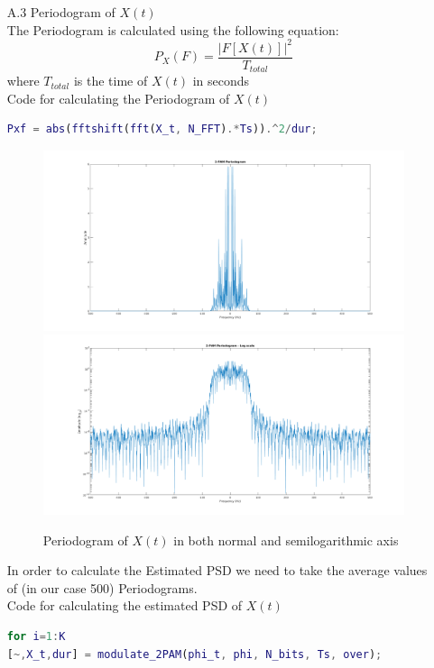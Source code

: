 \documentclass[12pt, a4paper]{article}
\begin{document}
\begin{enumerate}
\begin{enumerate}
        \item[A.3] Periodogram of \(X(t)\)\\
        The Periodogram is calculated using the following equation:
        \[P_X(F) = \frac{|F[X(t)]|^2}{T_{total}}\]
        where \(T_{total}\) is the time of \(X(t)\) in seconds\\
        Code for calculating the Periodogram of \(X(t)\)
        \begin{lstlisting}[language=MATLAB]
Pxf = abs(fftshift(fft(X_t, N_FFT).*Ts)).^2/dur;
       	\end{lstlisting}
        \begin{figure}[H]
            \centering
            \noindent\includegraphics[width=\textwidth]{2PAM_PSD_PLOT.png}
            \noindent\includegraphics[width=\textwidth]{2PAM_PSD.png}
            \caption{Periodogram of \(X(t)\) in both normal and semilogarithmic axis}
        \end{figure}
        In order to calculate the Estimated PSD we need to take the average values of (in our case 500) Periodograms.\\
        Code for calculating the estimated PSD of \(X(t)\)
        \begin{lstlisting}[language=MATLAB]
for i=1:K
[~,X_t,dur] = modulate_2PAM(phi_t, phi, N_bits, Ts, over);

\end{lstlisting}
\end{enumerate}
\end{enumerate}
\end{document}
